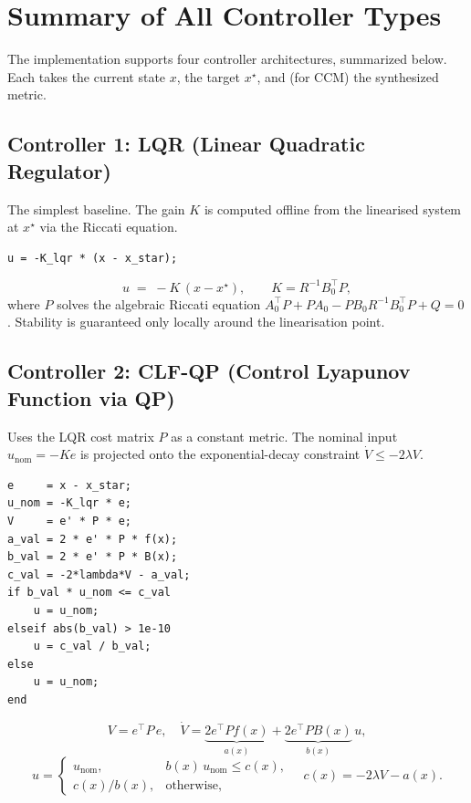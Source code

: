 \documentclass[11pt,a4paper]{article}
\begin{document}
\section{Summary of All Controller Types}
\label{sec:controller_types}

The implementation supports four controller architectures, summarized below.  Each takes the current state \(x\), the target \(x^\star\), and (for CCM) the synthesized metric.

\subsection{Controller 1: LQR (Linear Quadratic Regulator)}

The simplest baseline.  The gain \(K\) is computed offline from the linearised system at \(x^\star\) via the Riccati equation.

\begin{lstlisting}
u = -K_lqr * (x - x_star);
\end{lstlisting}

\begin{codemath}
\[
u \;=\; -K\,(x - x^\star), \qquad
K = R^{-1}B_0^\top P,
\]
where \(P\) solves the algebraic Riccati equation \(A_0^\top P + PA_0 - PB_0 R^{-1}B_0^\top P + Q = 0\).
Stability is guaranteed only locally around the linearisation point.
\end{codemath}

\subsection{Controller 2: CLF-QP (Control Lyapunov Function via QP)}

Uses the LQR cost matrix \(P\) as a constant metric.  The nominal input \(u_{\mathrm{nom}} = -Ke\) is projected onto the exponential-decay constraint \(\dot V \le -2\lambda V\).

\begin{lstlisting}
e     = x - x_star;
u_nom = -K_lqr * e;
V     = e' * P * e;
a_val = 2 * e' * P * f(x);
b_val = 2 * e' * P * B(x);
c_val = -2*lambda*V - a_val;
if b_val * u_nom <= c_val
    u = u_nom;
elseif abs(b_val) > 1e-10
    u = c_val / b_val;
else
    u = u_nom;
end
\end{lstlisting}

\begin{codemath}
\[
V = e^\top P\,e, \quad
\dot V = \underbrace{2e^\top P f(x)}_{a(x)}
       + \underbrace{2e^\top P B(x)}_{b(x)}\, u,
\]
\[
u =
\begin{cases}
u_{\mathrm{nom}}, & b(x)\,u_{\mathrm{nom}} \le c(x), \\
c(x)/b(x), & \text{otherwise},
\end{cases}
\quad c(x) = -2\lambda V - a(x).
\]
\end{codemath}
\end{document}
